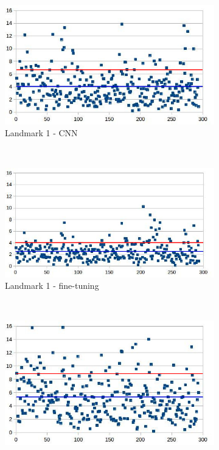 \documentclass[10pt]{article}
\begin{document}
\begin{figure}[htbp]
   
    \begin{subfigure}[t]{0.25\textwidth}
        \centering
        \includegraphics[scale=.35]{images/lm1_cnn_2}
        \caption{\small{Landmark 1 - CNN}}
        \label{figsub11}
    \end{subfigure}%
    ~ 
    \begin{subfigure}[t]{0.25\textwidth}
        \centering
        \includegraphics[scale=.34]{images/lm1_finetuning_2}
        \caption{\small{Landmark 1 - fine-tuning}}
        \label{figsub22}
    \end{subfigure}~\\
    \begin{subfigure}[t]{0.25\textwidth}
        \centering
        \includegraphics[scale=.33]{images/lm6_cnn_2}

\end{subfigure}
\end{figure}
\end{document}
